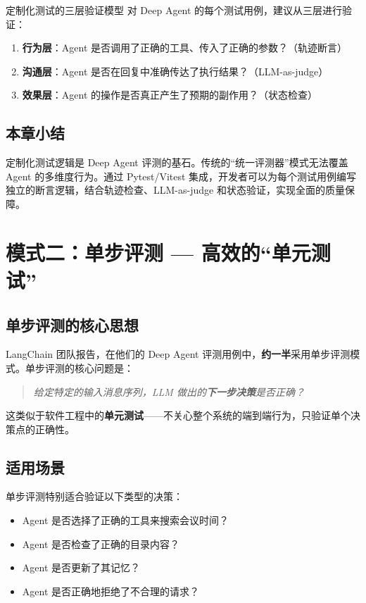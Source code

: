 \documentclass[a4paper]{article}
\begin{document}
\begin{importantbox}{定制化测试的三层验证模型}
对 Deep Agent 的每个测试用例，建议从三层进行验证：
\begin{enumerate}
  \item \textbf{行为层}：Agent 是否调用了正确的工具、传入了正确的参数？（轨迹断言）
  \item \textbf{沟通层}：Agent 是否在回复中准确传达了执行结果？（LLM-as-judge）
  \item \textbf{效果层}：Agent 的操作是否真正产生了预期的副作用？（状态检查）
\end{enumerate}
\end{importantbox}

\subsection{本章小结}

定制化测试逻辑是 Deep Agent 评测的基石。传统的``统一评测器''模式无法覆盖 Agent 的多维度行为。通过 Pytest/Vitest 集成，开发者可以为每个测试用例编写独立的断言逻辑，结合轨迹检查、LLM-as-judge 和状态验证，实现全面的质量保障。


\section{模式二：单步评测 --- 高效的``单元测试''}

\subsection{单步评测的核心思想}

LangChain 团队报告，在他们的 Deep Agent 评测用例中，\textbf{约一半}采用单步评测模式。单步评测的核心问题是：

\begin{quote}
\textit{给定特定的输入消息序列，LLM 做出的\textbf{下一步决策}是否正确？}
\end{quote}

这类似于软件工程中的\textbf{单元测试}——不关心整个系统的端到端行为，只验证单个决策点的正确性。

\subsection{适用场景}

单步评测特别适合验证以下类型的决策：

\begin{itemize}
  \item Agent 是否选择了正确的工具来搜索会议时间？
  \item Agent 是否检查了正确的目录内容？
  \item Agent 是否更新了其记忆？
  \item Agent 是否正确地拒绝了不合理的请求？
\end{itemize}
\end{document}
